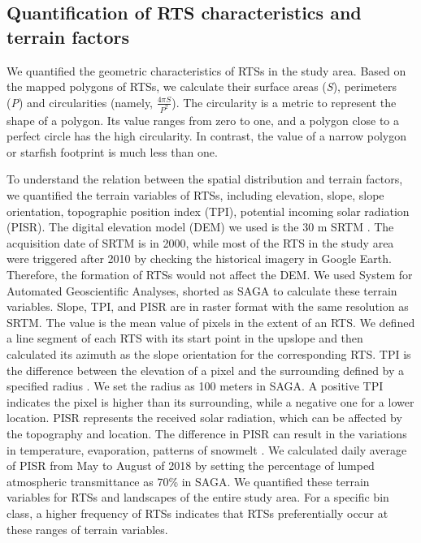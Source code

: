 \documentclass[preprint,12pt,authoryear]{elsarticle}
\begin{document}
\subsection{Quantification of RTS characteristics and terrain factors}
\label{subsec_quantify_rts}

We quantified the geometric characteristics of RTSs in the study area. Based on the mapped polygons of RTSs, we calculate their surface areas (\emph{S}), perimeters (\emph{P}) and circularities (namely, $\frac{4 \pi S}{P^2} $). The circularity is a metric to represent the shape of a polygon. Its value ranges from zero to one, and a polygon close to a perfect circle has the high circularity. In contrast, the value of a narrow polygon or starfish footprint is much less than one. 

To understand the relation between the spatial distribution and terrain factors, we quantified the terrain variables of RTSs, including elevation, slope, slope orientation, topographic position index (TPI), potential incoming solar radiation (PISR). The digital elevation model (DEM) we used is the 30 m SRTM \citep{farr2007shuttle}. The acquisition date of SRTM is in 2000, while most of the RTS in the study area were triggered after 2010 by checking the historical imagery in Google Earth. Therefore, the formation of RTSs would not affect the DEM. We used System for Automated Geoscientific Analyses, shorted as SAGA \citep{conrad2015system} to calculate these terrain variables. Slope, TPI, and PISR are in raster format with the same resolution as SRTM. The value is the mean value of pixels in the extent of an RTS. We defined a line segment of each RTS with its start point in the upslope and then calculated its azimuth as the slope orientation for the corresponding RTS. TPI is the difference between the elevation of a pixel and the surrounding defined by a specified radius \citep{guisan1999glm, reu2013application}. We set the radius as 100 meters in SAGA. A positive TPI indicates the pixel is higher than its surrounding, while a negative one for a lower location. PISR represents the received solar radiation, which can be affected by the topography and location. The difference in PISR can result in the variations in temperature, evaporation, patterns of snowmelt \citep{bohner2009land}. We calculated daily average of PISR from May to August of 2018 by setting the percentage of lumped atmospheric transmittance as 70\% in SAGA. We quantified these terrain variables for RTSs and landscapes of the entire study area. For a specific bin class, a higher frequency of RTSs indicates that RTSs preferentially occur at these ranges of terrain variables. 
\end{document}
